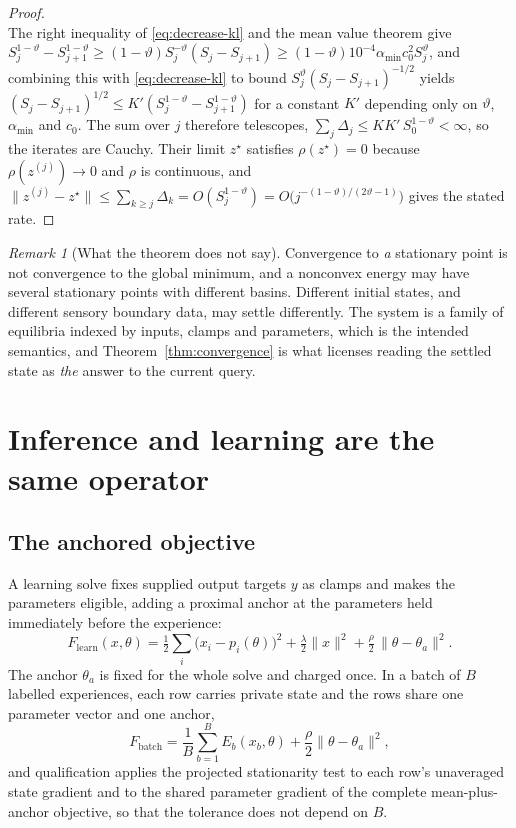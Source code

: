 \documentclass[11pt]{article}
\theoremstyle{definition}
\theoremstyle{remark}
\newtheorem{remark}[theorem]{Remark}
\begin{document}
\begin{proof}
\begin{equation}
\end{equation}
The right inequality of \eqref{eq:decrease-kl} and the mean value theorem give
$S_j^{1-\vartheta}-S_{j+1}^{1-\vartheta}\ge(1-\vartheta)S_j^{-\vartheta}(S_j-S_{j+1})
\ge(1-\vartheta)10^{-4}\alpha_{\min}c_0^2S_j^{\vartheta}$, and combining this with
\eqref{eq:decrease-kl} to bound $S_j^{\vartheta}(S_j-S_{j+1})^{-1/2}$ yields
$(S_j-S_{j+1})^{1/2}\le K'(S_j^{1-\vartheta}-S_{j+1}^{1-\vartheta})$ for a constant $K'$ depending only
on $\vartheta$, $\alpha_{\min}$ and $c_0$. The sum over $j$ therefore telescopes,
$\sum_j\Delta_j\le KK'\,S_0^{1-\vartheta}<\infty$, so the iterates are Cauchy. Their limit $z^\star$
satisfies $\rho(z^\star)=0$ because $\rho(z^{(j)})\to0$ and $\rho$ is continuous, and
$\|z^{(j)}-z^\star\|\le\sum_{k\ge j}\Delta_k=O(S_j^{1-\vartheta})=O\big(j^{-(1-\vartheta)/(2\vartheta-1)}\big)$
gives the stated rate.
\end{proof}

\begin{remark}[What the theorem does not say]
Convergence to \emph{a} stationary point is not convergence to the global minimum, and a nonconvex
energy may have several stationary points with different basins. Different initial states, and
different sensory boundary data, may settle differently. The system is a family of equilibria indexed
by inputs, clamps and parameters, which is the intended semantics, and Theorem~\ref{thm:convergence} is
what licenses reading the settled state as \emph{the} answer to the current query.
\end{remark}

\section{Inference and learning are the same operator}
\label{sec:oneop}

\subsection{The anchored objective}
A learning solve fixes supplied output targets $y$ as clamps and makes the parameters eligible, adding
a proximal anchor at the parameters held immediately before the experience:
\begin{equation}
F_{\text{learn}}(x,\theta)=\tfrac12\sum_i\big(x_i-p_i(\theta)\big)^2
+\tfrac{\lambda}{2}\|x\|^2
+\tfrac{\rho}{2}\,\|\theta-\theta_a\|^2 .
\label{eq:anchored}
\end{equation}
The anchor $\theta_a$ is fixed for the whole solve and charged once. In a batch of $B$ labelled
experiences, each row carries private state and the rows share one parameter vector and one anchor,
\begin{equation}
F_{\text{batch}}=\frac1B\sum_{b=1}^{B}E_b(x_b,\theta)+\frac{\rho}{2}\|\theta-\theta_a\|^2 ,
\label{eq:batch}
\end{equation}
and qualification applies the projected stationarity test to each row's unaveraged state gradient and
to the shared parameter gradient of the complete mean-plus-anchor objective, so that the tolerance does
not depend on $B$.
\end{document}

